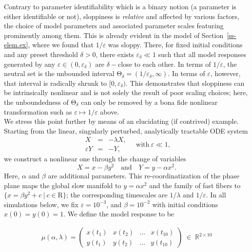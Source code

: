 \documentclass{article}
\newcommand{\eps}{\varepsilon}
\newcommand{\omr}{\mu}
\newcommand{\R}{\mathrm{R}}
\newcommand{\ps}{\mathrm{\Theta}}
\newcommand{\be}{\begin{equation}}
\newcommand{\ee}{\end{equation}}
\begin{document}
Contrary to parameter identifiability which is a binary notion (a
parameter is either identifiable or not), sloppiness is
\emph{relative} and affected by various factors, the choice of model
parameters and associated parameter scales featuring prominently among
them.  This is already evident in the model of
Section~\ref{ss-elem.ex}, where we found that $1/\eps$ was sloppy.
There, for fixed initial conditions and any preset threshold
$\delta > 0$, there exists $\eps_\delta \ll 1$ such that all model
responses generated by any $\eps \in (0,\eps_\delta)$ are
$\delta-$close to each other.  In terms of $1/\eps$, the neutral set
is the unbounded interval $\ps_\delta = (1/\eps_\delta,\infty)$.  In
terms of $\eps$, however, that interval is radically shrunk to
$[0,\eps_\delta)$.  This demonstrates that sloppiness can be
intrinsically nonlinear and is not solely the result of poor scaling
choices; here, the unboundedness of $\ps_\delta$ can only be removed
by a bona fide nonlinear transformation such as $\eps \mapsto 1/\eps$
above.\\

We stress this point further by means of an elucidating (if contrived) example.
Starting from the linear, singularly perturbed, analytically tractable ODE system
%
\be
\begin{array}{rcl}
 X &=& -\lambda X ,
\\
 \eps Y &=& - Y ,
\end{array}
\quad\mbox{with}\ \eps \ll 1 ,
\label{XY-system}
\ee
%
we construct a nonlinear one through the change of variables
%
\[
 X = x - \beta y^2
\quad\mbox{and}\quad
 Y = y - \alpha x^2 .
\]
%
Here, $\alpha$ and $\beta$ are additional parameters.  This
re-coordinatization of the phase plane maps the global slow manifold
to $y=\alpha x^2$ and the family of fast fibers to
$\{x=\beta y^2 +c \ \vert \ c\in \R\}$; the corresponding timescales are
$1/\lambda$ and $1/\eps$.  In all simulations below, we fix
$\eps = 10^{-3}$, and $\beta = 10^{-2}$ with initial conditions
$x(0) = y(0) = 1$. We define the model response to be

\begin{align}
  \omr(\alpha, \lambda) = \begin{pmatrix} x(t_1) & x(t_2)
    & \hdots &  x(t_{10}) \\ 
    y(t_1) & y(t_2) & \hdots & y(t_{10}) \end{pmatrix} \; \in  \; \mathbb{R}^{2 \times 10} \\
  \label{eq:henon-mr}
\end{align}
\end{document}
